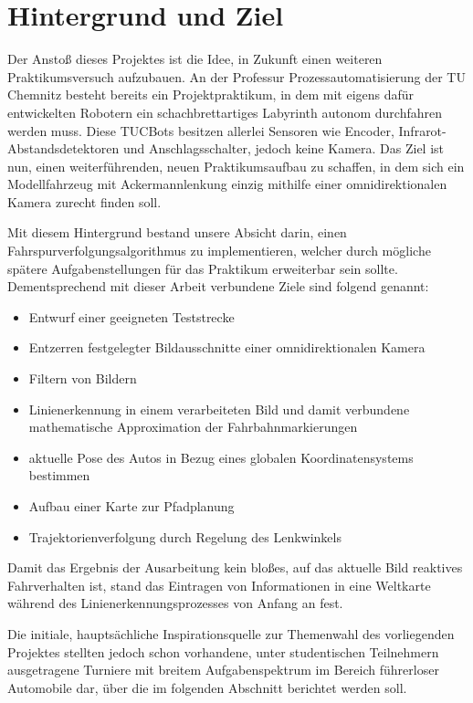\section{Hintergrund und Ziel \dcfirstauthorshort}

Der Anstoß dieses Projektes ist die Idee, in Zukunft einen weiteren Praktikumsversuch aufzubauen. An der Professur Prozessautomatisierung der TU Chemnitz besteht bereits ein Projektpraktikum, in dem mit eigens dafür entwickelten Robotern ein schachbrettartiges Labyrinth autonom durchfahren werden muss. Diese \glqq TUCBots\grqq{} besitzen allerlei Sensoren wie Encoder, Infrarot-Abstandsdetektoren und Anschlagsschalter, jedoch keine Kamera. Das Ziel ist nun, einen weiterführenden, neuen Praktikumsaufbau zu schaffen, in dem sich ein Modellfahrzeug mit Ackermannlenkung einzig mithilfe einer omnidirektionalen Kamera zurecht finden soll. 

Mit diesem Hintergrund bestand unsere Absicht darin, einen Fahrspurverfolgungsalgorithmus zu implementieren, welcher durch mögliche spätere Aufgabenstellungen für das Praktikum erweiterbar sein sollte. Dementsprechend mit dieser Arbeit verbundene Ziele sind folgend genannt:

\begin{itemize}
\item Entwurf einer geeigneten Teststrecke
\item Entzerren festgelegter Bildausschnitte einer omnidirektionalen Kamera
\item Filtern von Bildern
\item Linienerkennung in einem verarbeiteten Bild und damit verbundene mathematische Approximation der Fahrbahnmarkierungen
\item aktuelle Pose des Autos in Bezug eines globalen Koordinatensystems bestimmen
\item Aufbau einer Karte zur Pfadplanung
\item Trajektorienverfolgung durch Regelung des Lenkwinkels
\end{itemize}

Damit das Ergebnis der Ausarbeitung kein bloßes, auf das aktuelle Bild reaktives Fahrverhalten ist, stand das Eintragen von Informationen in eine Weltkarte während des Linienerkennungsprozesses von Anfang an fest. 

Die initiale, hauptsächliche Inspirationsquelle zur Themenwahl des vorliegenden Projektes stellten jedoch schon vorhandene, unter studentischen Teilnehmern ausgetragene Turniere mit breitem Aufgabenspektrum im Bereich führerloser Automobile dar, über die im folgenden Abschnitt berichtet werden soll.
